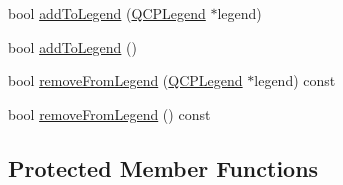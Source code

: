 \begin{DoxyCompactItemize}
\item 
bool \hyperlink{classQCPAbstractPlottable_aa64e93cb5b606d8110d2cc0a349bb30f}{add\+To\+Legend} (\hyperlink{classQCPLegend}{Q\+C\+P\+Legend} $\ast$legend)
\item 
bool \hyperlink{classQCPAbstractPlottable_a70f8cabfd808f7d5204b9f18c45c13f5}{add\+To\+Legend} ()
\item 
bool \hyperlink{classQCPAbstractPlottable_a26d936d11852ea08e6bc0edae3a514a2}{remove\+From\+Legend} (\hyperlink{classQCPLegend}{Q\+C\+P\+Legend} $\ast$legend) const 
\item 
bool \hyperlink{classQCPAbstractPlottable_aa1f350e510326d012b9a9c9249736c83}{remove\+From\+Legend} () const 
\end{DoxyCompactItemize}
\subsection*{Protected Member Functions}
